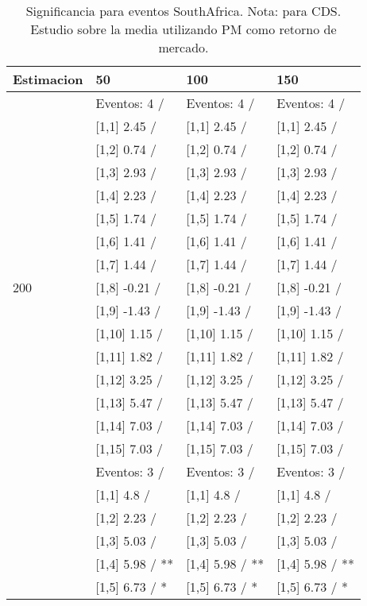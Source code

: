 \begin{table}

\caption{Significancia para eventos SouthAfrica. Nota: para CDS. Estudio sobre la media utilizando PM como retorno de mercado.}
\centering
\begin{tabular}[t]{llll}
\toprule
Estimacion & 50 & 100 & 150\\
\midrule
 & Eventos:  4 / & Eventos:  4 / & Eventos:  4 /\\
 & {}[1,1] 2.45  / & {}[1,1] 2.45  / & {}[1,1] 2.45  /\\
 & {}[1,2] 0.74  / & {}[1,2] 0.74  / & {}[1,2] 0.74  /\\
 & {}[1,3] 2.93  / & {}[1,3] 2.93  / & {}[1,3] 2.93  /\\
 & {}[1,4] 2.23  / & {}[1,4] 2.23  / & {}[1,4] 2.23  /\\
\addlinespace
 & {}[1,5] 1.74  / & {}[1,5] 1.74  / & {}[1,5] 1.74  /\\
 & {}[1,6] 1.41  / & {}[1,6] 1.41  / & {}[1,6] 1.41  /\\
 & {}[1,7] 1.44  / & {}[1,7] 1.44  / & {}[1,7] 1.44  /\\
200 & {}[1,8] -0.21  / & {}[1,8] -0.21  / & {}[1,8] -0.21  /\\
 & {}[1,9] -1.43  / & {}[1,9] -1.43  / & {}[1,9] -1.43  /\\
\addlinespace
 & {}[1,10] 1.15  / & {}[1,10] 1.15  / & {}[1,10] 1.15  /\\
 & {}[1,11] 1.82  / & {}[1,11] 1.82  / & {}[1,11] 1.82  /\\
 & {}[1,12] 3.25  / & {}[1,12] 3.25  / & {}[1,12] 3.25  /\\
 & {}[1,13] 5.47  / & {}[1,13] 5.47  / & {}[1,13] 5.47  /\\
 & {}[1,14] 7.03  / & {}[1,14] 7.03  / & {}[1,14] 7.03  /\\
\addlinespace
 & {}[1,15] 7.03  / & {}[1,15] 7.03  / & {}[1,15] 7.03  /\\
 & Eventos:  3 / & Eventos:  3 / & Eventos:  3 /\\
 & {}[1,1] 4.8  / & {}[1,1] 4.8  / & {}[1,1] 4.8  /\\
 & {}[1,2] 2.23  / & {}[1,2] 2.23  / & {}[1,2] 2.23  /\\
 & {}[1,3] 5.03  / & {}[1,3] 5.03  / & {}[1,3] 5.03  /\\
\addlinespace
 & {}[1,4] 5.98  / ** & {}[1,4] 5.98  / ** & {}[1,4] 5.98  / **\\
 & {}[1,5] 6.73  / * & {}[1,5] 6.73  / * & {}[1,5] 6.73  / *\\

\end{tabular}
\end{table}
